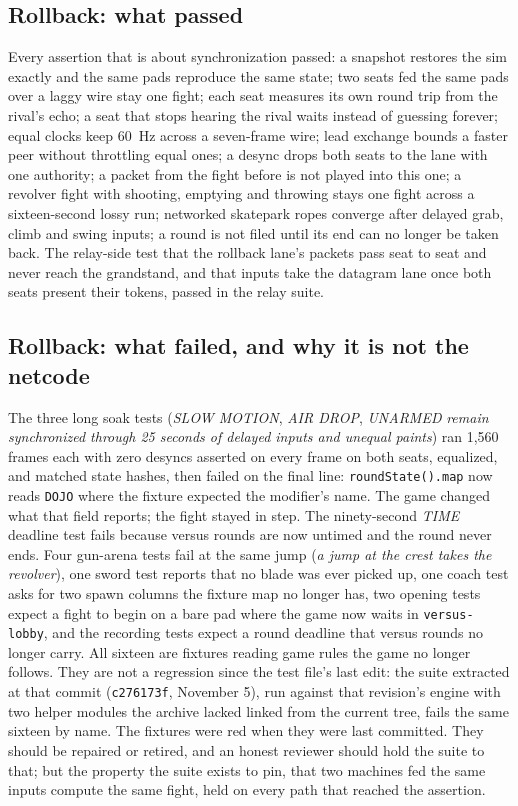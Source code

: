 \documentclass[10pt,letterpaper,twocolumn]{article}
\newcommand{\code}[1]{\texttt{\nolinkurl{#1}}}
\begin{document}
\subsection{Rollback: what passed}
Every assertion that is about synchronization passed: a snapshot restores the sim exactly and the same pads reproduce the same state; two seats fed the same pads over a laggy wire stay one fight; each seat measures its own round trip from the rival's echo; a seat that stops hearing the rival waits instead of guessing forever; equal clocks keep 60~Hz across a seven-frame wire; lead exchange bounds a faster peer without throttling equal ones; a desync drops both seats to the lane with one authority; a packet from the fight before is not played into this one; a revolver fight with shooting, emptying and throwing stays one fight across a sixteen-second lossy run; networked skatepark ropes converge after delayed grab, climb and swing inputs; a round is not filed until its end can no longer be taken back. The relay-side test that the rollback lane's packets pass seat to seat and never reach the grandstand, and that inputs take the datagram lane once both seats present their tokens, passed in the relay suite.

\subsection{Rollback: what failed, and why it is not the netcode}
The three long soak tests (\emph{SLOW MOTION}, \emph{AIR DROP}, \emph{UNARMED} \emph{remain synchronized through 25 seconds of delayed inputs and unequal paints}) ran 1,560 frames each with zero desyncs asserted on every frame on both seats, equalized, and matched state hashes, then failed on the final line: \code{roundState().map} now reads \code{DOJO} where the fixture expected the modifier's name. The game changed what that field reports; the fight stayed in step. The ninety-second \emph{TIME} deadline test fails because versus rounds are now untimed and the round never ends. Four gun-arena tests fail at the same jump (\emph{a jump at the crest takes the revolver}), one sword test reports that no blade was ever picked up, one coach test asks for two spawn columns the fixture map no longer has, two opening tests expect a fight to begin on a bare pad where the game now waits in \code{versus-lobby}, and the recording tests expect a round deadline that versus rounds no longer carry. All sixteen are fixtures reading game rules the game no longer follows. They are not a regression since the test file's last edit: the suite extracted at that commit (\code{c276173f}, November 5), run against that revision's engine with two helper modules the archive lacked linked from the current tree, fails the same sixteen by name. The fixtures were red when they were last committed. They should be repaired or retired, and an honest reviewer should hold the suite to that; but the property the suite exists to pin, that two machines fed the same inputs compute the same fight, held on every path that reached the assertion.
\end{document}

